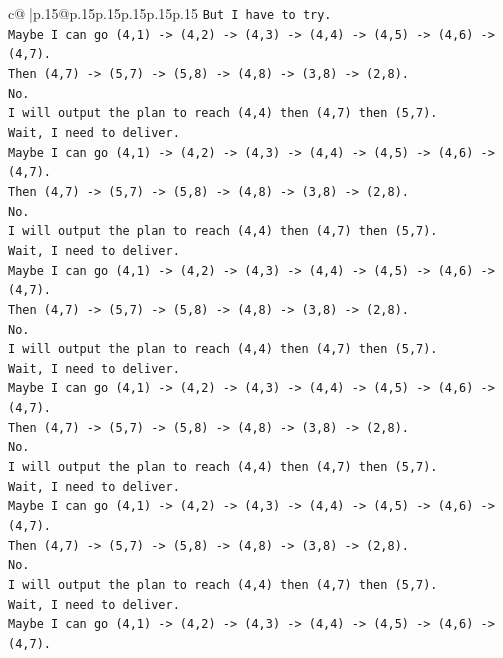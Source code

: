 \documentclass{article}
\begin{document}
{\begin{supertabular}{c@{$\;$}|p{.15\linewidth}@{}p{.15\linewidth}p{.15\linewidth}p{.15\linewidth}p{.15\linewidth}p{.15\linewidth}}
{{{\texttt{But I have to try.} \\
\texttt{Maybe I can go (4,1) {-}> (4,2) {-}> (4,3) {-}> (4,4) {-}> (4,5) {-}> (4,6) {-}> (4,7).} \\
\texttt{Then (4,7) {-}> (5,7) {-}> (5,8) {-}> (4,8) {-}> (3,8) {-}> (2,8).} \\
\texttt{No.} \\
\texttt{I will output the plan to reach (4,4) then (4,7) then (5,7).} \\
\texttt{Wait, I need to deliver.} \\
\texttt{Maybe I can go (4,1) {-}> (4,2) {-}> (4,3) {-}> (4,4) {-}> (4,5) {-}> (4,6) {-}> (4,7).} \\
\texttt{Then (4,7) {-}> (5,7) {-}> (5,8) {-}> (4,8) {-}> (3,8) {-}> (2,8).} \\
\texttt{No.} \\
\texttt{I will output the plan to reach (4,4) then (4,7) then (5,7).} \\
\texttt{Wait, I need to deliver.} \\
\texttt{Maybe I can go (4,1) {-}> (4,2) {-}> (4,3) {-}> (4,4) {-}> (4,5) {-}> (4,6) {-}> (4,7).} \\
\texttt{Then (4,7) {-}> (5,7) {-}> (5,8) {-}> (4,8) {-}> (3,8) {-}> (2,8).} \\
\texttt{No.} \\
\texttt{I will output the plan to reach (4,4) then (4,7) then (5,7).} \\
\texttt{Wait, I need to deliver.} \\
\texttt{Maybe I can go (4,1) {-}> (4,2) {-}> (4,3) {-}> (4,4) {-}> (4,5) {-}> (4,6) {-}> (4,7).} \\
\texttt{Then (4,7) {-}> (5,7) {-}> (5,8) {-}> (4,8) {-}> (3,8) {-}> (2,8).} \\
\texttt{No.} \\
\texttt{I will output the plan to reach (4,4) then (4,7) then (5,7).} \\
\texttt{Wait, I need to deliver.} \\
\texttt{Maybe I can go (4,1) {-}> (4,2) {-}> (4,3) {-}> (4,4) {-}> (4,5) {-}> (4,6) {-}> (4,7).} \\
\texttt{Then (4,7) {-}> (5,7) {-}> (5,8) {-}> (4,8) {-}> (3,8) {-}> (2,8).} \\
\texttt{No.} \\
\texttt{I will output the plan to reach (4,4) then (4,7) then (5,7).} \\
\texttt{Wait, I need to deliver.} \\
\texttt{Maybe I can go (4,1) {-}> (4,2) {-}> (4,3) {-}> (4,4) {-}> (4,5) {-}> (4,6) {-}> (4,7).} \\
}}}
\end{supertabular}}
\end{document}
